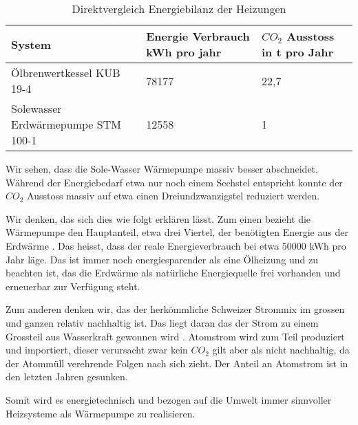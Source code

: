 \begin{table}
\begin{center}
\begin{tabular}{|l|l|l|}

\hline
  System   & Energie Verbrauch kWh pro jahr & $CO_2$ Ausstoss in t pro Jahr\\
\hline
 Ölbrenwertkessel KUB 19-4           & 78177 & 22,7 \\
\hline
 Solewasser Erdwärmepumpe STM 100-1  & 12558 & 1     \\
\hline
\end{tabular}
\end{center}
\label{bilanz:vergleich}
\caption{Direktvergleich Energiebilanz der Heizungen}
\end{table}

Wir sehen, dass die Sole-Wasser Wärmepumpe massiv besser abschneidet.
Während der Energiebedarf etwa nur noch einem Sechstel entspricht konnte
der $CO_2$ Ausstoss massiv auf etwa einen Dreiundzwanzigstel reduziert werden.

Wir denken, das sich dies wie folgt erklären lässt.
Zum einen bezieht die Wärmepumpe den Hauptanteil, etwa drei Viertel, der benötigten Energie
aus der Erdwärme \cite{junkers:funktionwarmepumpe}.
Das heisst, dass der reale Energieverbrauch bei etwa 50000 kWh pro Jahr läge. Das ist immer noch energiesparender als eine Ölheizung und zu beachten ist, das die Erdwärme als natürliche Energiequelle frei vorhanden und erneuerbar zur Verfügung steht.

Zum anderen denken wir, das der herkömmliche Schweizer Strommix im grossen und
ganzen relativ nachhaltig ist. Das liegt daran das der Strom zu einem Grossteil
aus Wasserkraft gewonnen wird \cite{bafu:strommix}.
Atomstrom wird zum Teil produziert und importiert, dieser verursacht zwar kein
$CO_2$ gilt aber als nicht nachhaltig, da der Atommüll verehrende Folgen
nach sich zieht.
Der Anteil an Atomstrom ist in den letzten Jahren gesunken.

Somit wird es energietechnisch und bezogen auf die Umwelt immer sinnvoller
Heizsysteme als Wärmepumpe zu realisieren.
